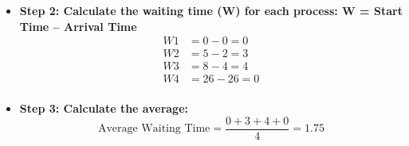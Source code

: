 \begin{itemize}
\begin{itemize}
        \item \textbf{Step 2: Calculate the waiting time (W) for each process: W = Start Time – Arrival Time}
        \begin{align*}
            W1 &= 0 - 0 = 0 \\
            W2 &= 5 - 2 = 3 \\
            W3 &= 8 - 4 = 4 \\
            W4 &= 26 - 26 = 0 \\
        \end{align*}
        
        \item \textbf{Step 3: Calculate the average:}
        \[
            \text{Average Waiting Time} = \frac{0 + 3 + 4 + 0}{4} = 1.75
        \]
    \end{itemize}
\end{itemize}

